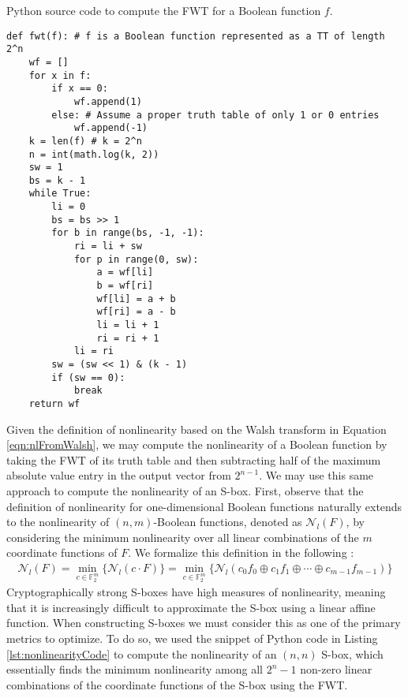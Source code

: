 \begin{listing}[ht!]
\caption{Python source code to compute the FWT for a Boolean function $f$.}
\begin{verbatim}
def fwt(f): # f is a Boolean function represented as a TT of length 2^n
	wf = []
	for x in f:
		if x == 0:
			wf.append(1)
		else: # Assume a proper truth table of only 1 or 0 entries
			wf.append(-1)
	k = len(f) # k = 2^n
	n = int(math.log(k, 2))
	sw = 1
	bs = k - 1
	while True:
		li = 0
		bs = bs >> 1
		for b in range(bs, -1, -1):
			ri = li + sw
			for p in range(0, sw):
				a = wf[li]
				b = wf[ri]
				wf[li] = a + b
				wf[ri] = a - b
				li = li + 1
				ri = ri + 1
			li = ri
		sw = (sw << 1) & (k - 1)
		if (sw == 0):
			break
	return wf
\end{verbatim}
\label{lst:fwt}
\end{listing} 

Given the definition of nonlinearity based on the Walsh transform in Equation \ref{eqn:nlFromWalsh}, we may compute the nonlinearity of a Boolean function by taking the FWT of its truth table and then subtracting half of the maximum absolute value entry in the output vector from $2^{n-1}$. We may use this same approach to compute the nonlinearity of an S-box. First, observe that the definition of nonlinearity for one-dimensional Boolean functions naturally extends to the nonlinearity of $(n,m)$-Boolean functions, denoted as $\mathcal{N}_l(F)$, by considering the minimum nonlinearity over all linear combinations of the $m$ coordinate functions of $F$. We formalize this definition in the following \cite{Carlet10-1}: 
\begin{align*}
\mathcal{N}_l(F) = \min_{c \in \mathbb{F}_2^m}\{\mathcal{N}_l(c \cdot F)\} = \min_{c \in \mathbb{F}_2^m}\{\mathcal{N}_l(c_0f_0 \oplus c_1f_1 \oplus \dotsb \oplus c_{m-1}f_{m-1})\}
\end{align*}
Cryptographically strong S-boxes have high measures of nonlinearity, meaning that it is increasingly difficult to approximate the S-box using a linear affine function. When constructing S-boxes we must consider this as one of the primary metrics to optimize. To do so, we used the snippet of Python code in Listing \ref{lst:nonlinearityCode} to compute the nonlinearity of an $(n,n)$ S-box, which essentially finds the minimum nonlinearity among all $2^n - 1$ non-zero linear combinations of the coordinate functions of the S-box using the FWT.

